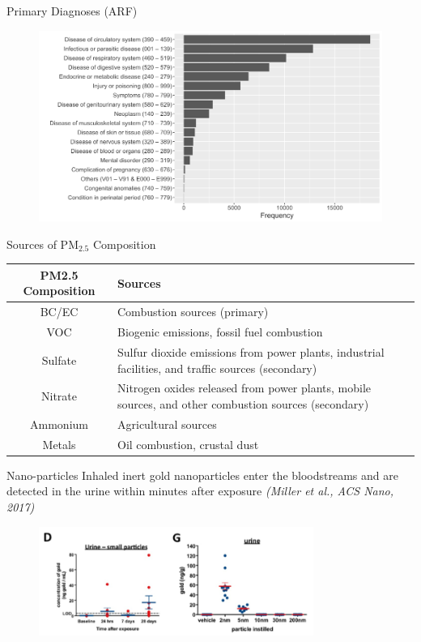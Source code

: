 \documentclass{beamer}
\begin{document}
\begin{frame}{Primary Diagnoses (ARF)}
    \begin{figure}
        \centering
        \includegraphics[width=\textwidth]{img/appendix/Aim3/arf_pri.png}
    \end{figure}
\end{frame}

\begin{frame}{Sources of PM$_{2.5}$ Composition}
    \begin{table}
    \centering
    \begin{tabular}{|c|p{}|}
        \hline
        \textbf{PM2.5 Composition} & \textbf{Sources}  \\
        \hline
        BC/EC & Combustion sources (primary) \\
        \hline
        VOC & Biogenic emissions, fossil fuel combustion \\
        \hline
        Sulfate &  Sulfur dioxide emissions from power plants, industrial facilities, and traffic sources (secondary) \\
        \hline
        Nitrate & Nitrogen oxides released from power plants, mobile sources, and other combustion sources (secondary) \\
        \hline
        Ammonium & Agricultural sources \\
        \hline 
        Metals &  Oil combustion, crustal dust \\
        \hline
    \end{tabular}
\end{table}
\end{frame}

\begin{frame}{Nano-particles}
Inhaled inert gold nanoparticles enter the bloodstreams and are detected in the urine within minutes after exposure \textit{\small (Miller et al., ACS Nano, 2017)}
\begin{figure}
    \centering
    \includegraphics[width=0.8\textwidth]{img/exposure.jpg}
\end{figure}
\end{frame}
\end{document}
